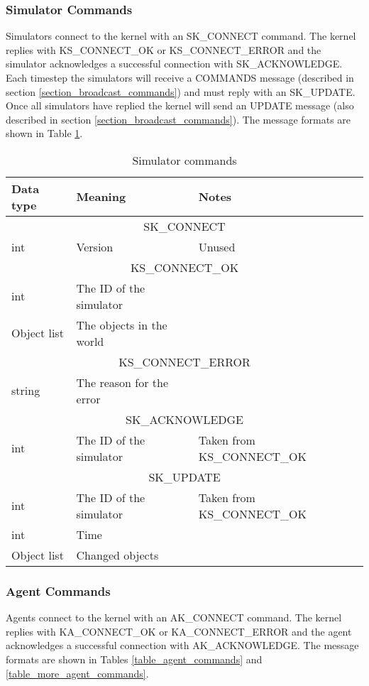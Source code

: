 \subsubsection{Simulator Commands}
Simulators connect to the kernel with an SK\_CONNECT command. The kernel replies with KS\_CONNECT\_OK or KS\_CONNECT\_ERROR and the simulator acknowledges a successful connection with SK\_ACKNOWLEDGE. Each timestep the simulators will receive a COMMANDS message (described in section \ref{section_broadcast_commands}) and must reply with an SK\_UPDATE. Once all simulators have replied the kernel will send an UPDATE message (also described in section \ref{section_broadcast_commands}). The message formats are shown in Table \ref{table_simulator_commands}.

\begin{table}[p]
\center
\begin{tabular}{|lll|}
\hline
Data type & Meaning & Notes\\
\hline
\hline
\multicolumn{3}{|c|}{SK\_CONNECT}\\
int & Version & Unused\\
\hline
\hline
\multicolumn{3}{|c|}{KS\_CONNECT\_OK}\\
int & The ID of the simulator & \\
Object list & The objects in the world & \\
\hline
\hline
\multicolumn{3}{|c|}{KS\_CONNECT\_ERROR}\\
string & The reason for the error & \\
\hline
\hline
\multicolumn{3}{|c|}{SK\_ACKNOWLEDGE}\\
int & The ID of the simulator & Taken from KS\_CONNECT\_OK \\
\hline
\hline
\multicolumn{3}{|c|}{SK\_UPDATE}\\
int & The ID of the simulator & Taken from KS\_CONNECT\_OK \\
int & Time & \\
Object list & Changed objects & \\
\hline
\end{tabular}
\caption{Simulator commands}
\label{table_simulator_commands}
\end{table}

\subsubsection{Agent Commands}
Agents connect to the kernel with an AK\_CONNECT command. The kernel replies with KA\_CONNECT\_OK or KA\_CONNECT\_ERROR and the agent acknowledges a successful connection with AK\_ACKNOWLEDGE. The message formats are shown in Tables \ref{table_agent_commands} and \ref{table_more_agent_commands}.

